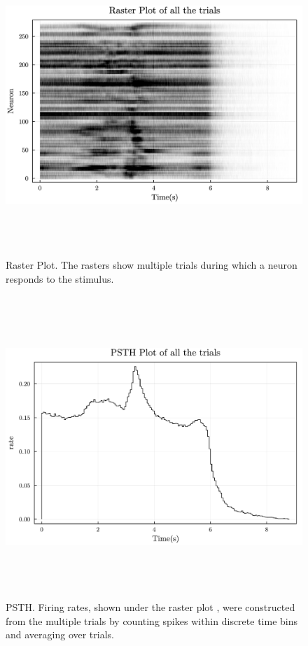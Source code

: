 \documentclass[9pt,twocolumn]{paper-template}
\begin{document}
\begin{figure}
\centering
\includegraphics[width=12cm,height=11.4cm]{TotRasterPlot.jpg}
\caption{Raster Plot. The rasters show multiple trials during which a neuron responds to the stimulus.}\label{fig:side}
\end{figure}
\begin{figure}
\centering
\includegraphics[width=12cm,height=11.4cm]{TotPSTHPlot.pdf}
\caption{PSTH. Firing rates, shown under the raster plot , were constructed from the multiple trials by counting spikes within discrete time bins and averaging over trials.}\label{fig:side}
\end{figure}
\end{document}
